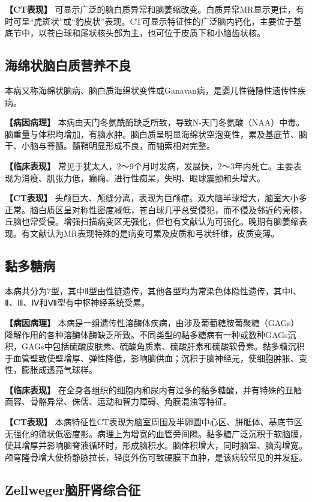 \textbf{【CT表现】}
可显示广泛的脑白质异常和脑萎缩改变。白质异常MR显示更佳，有时可呈“虎斑状”或“豹皮状”表现。CT可显示特征性的广泛脑内钙化，主要位于基底节中，以苍白球和尾状核头部为主，也可位于皮质下和小脑齿状核。

\subsection{海绵状脑白质营养不良}

本病又称海绵状脑病、脑白质海绵状变性或Ganavan病，是婴儿性链隐性遗传性疾病。

\textbf{【病因病理】}
本病由天门冬氨酰酶缺乏所致，导致N-天门冬氨酸（NAA）中毒。脑重量与体积均增加，有脑水肿。脑白质呈明显海绵状空泡变性，累及基底节、脑干、小脑与脊髓。髓鞘明显形成不良，而轴索相对完整。

\textbf{【临床表现】}
常见于犹太人，2～9个月时发病，发展快，2～3年内死亡。主要表现为消瘦、肌张力低，癫痫、进行性痴呆，失明、眼球震颤和头增大。

\textbf{【CT表现】}
头颅巨大、颅缝分离，表现为巨颅症。双大脑半球增大，脑室大小多正常。脑白质区呈对称性密度减低，苍白球几乎总受侵犯，而不侵及邻近的壳核，丘脑也常受侵。增强扫描病变区无强化，但也有文献认为可强化。晚期有脑萎缩表现。有文献认为MR表现特殊的是病变可累及皮质和弓状纤维，皮质变薄。

\subsection{黏多糖病}

本病共分为7型，其中Ⅱ型由性链遗传，其他各型均为常染色体隐性遗传，其中Ⅰ、Ⅱ、Ⅲ、Ⅳ和Ⅶ型有中枢神经系统受累。

\textbf{【病因病理】}
本病是一组遗传性溶酶体疾病，由涉及葡萄糖胺葡聚糖（GAGs）降解作用的各种溶酶体酶缺乏所致。不同类型的黏多糖病有一种或数种GAGs沉积，GAGs中包括硫酸皮肤素、硫酸角质素、硫酸肝素和硫酸软骨素。黏多糖沉积于血管壁致使壁增厚、弹性降低，影响脑供血；沉积于脑神经元，使细胞肿胀、变性，膨胀成透亮气球样。

\textbf{【临床表现】}
在全身各组织的细胞内和尿内有过多的黏多糖酸，并有特殊的丑陋面容、骨骼异常、侏儒、运动和智力障碍、角膜混浊等特征。

\textbf{【CT表现】}
本病特征性CT表现为脑室周围及半卵圆中心区、胼胝体、基底节区无强化的筛状低密度影。病理上为增宽的血管旁间隙。黏多糖广泛沉积于软脑膜，使其增厚并影响脑脊液循环时，形成脑积水。脑体积增大，同时脑室、脑沟增宽。颅穹隆骨增大使桥静脉拉长，轻度外伤可致硬膜下血肿，是该病较常见的并发症。

\subsection{Zellweger脑肝肾综合征}

